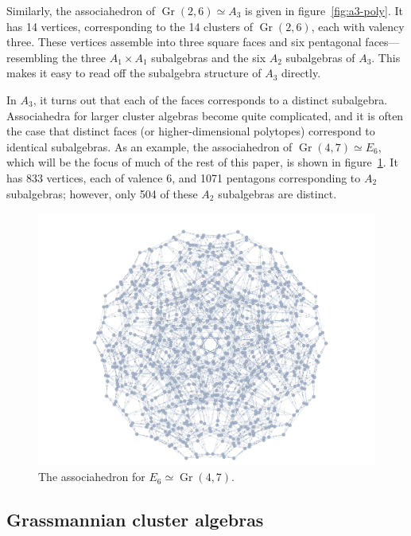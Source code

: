 \documentclass[11pt]{article}
\DeclareMathOperator{\Gr}{Gr}
\begin{document}
Similarly, the associahedron of $\Gr(2,6) \simeq A_3$ is given in figure~\ref{fig:a3-poly}. It has 14 vertices, corresponding to the 14 clusters of $\Gr(2,6)$, each with valency three. These vertices assemble into three square faces and six pentagonal faces---resembling the three $A_1 \times A_1$ subalgebras and the six $A_2$ subalgebras of $A_3$. This makes it easy to read off the subalgebra structure of $A_3$ directly. 

In $A_3$, it turns out that each of the faces corresponds to a distinct subalgebra. Associahedra for larger cluster algebras become quite complicated, and it is often the case that distinct faces (or higher-dimensional polytopes) correspond to identical subalgebras. As an example, the associahedron of $\Gr(4,7)\simeq E_6$, which will be the focus of much of the rest of this paper, is shown in figure~\ref{fig:e6-poly}. It has 833 vertices, each of valence 6, and 1071 pentagons corresponding to $A_2$ subalgebras; however, only 504 of these $A_2$ subalgebras are distinct.

\begin{figure}[t]  \centering
  \includegraphics[scale=0.25]{e6-associahedron}
  \caption{The associahedron for $E_6\simeq\Gr(4,7)$.}
  \label{fig:e6-poly}
\end{figure}

\subsection{Grassmannian cluster algebras}
\end{document}

